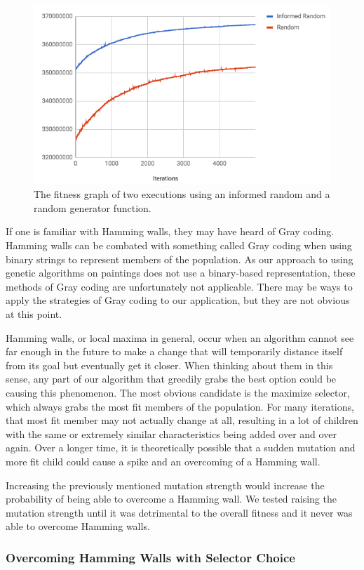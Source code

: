 \begin{figure}
    \centering
    \includegraphics[width=0.6\linewidth]{InformedvsRandom.png}
    \caption[Informed random and random generator fitness graphs]{The fitness graph of two executions using an informed random and a random generator function.}
    \label{fig:informedandrandom}
\end{figure}
If one is familiar with Hamming walls, they may have heard of Gray coding. Hamming walls can be combated with something called Gray coding\cite{hamming} when using binary strings to represent members of the population. As our approach to using genetic algorithms on paintings does not use a binary-based representation, these methods of Gray coding are unfortunately not applicable. There may be ways to apply the strategies of Gray coding to our application, but they are not obvious at this point. 

Hamming walls, or local maxima in general, occur when an algorithm cannot see far enough in the future to make a change that will temporarily distance itself from its goal but eventually get it closer. When thinking about them in this sense, any part of our algorithm that greedily grabs the best option could be causing this phenomenon. The most obvious candidate is the maximize selector, which always grabs the most fit members of the population. For many iterations, that most fit member may not actually change at all, resulting in a lot of children with the same or extremely similar characteristics being added over and over again. Over a longer time, it is theoretically possible that a sudden mutation and more fit child could cause a spike and an overcoming of a Hamming wall.

Increasing the previously mentioned mutation strength would increase the probability of being able to overcome a Hamming wall. We tested raising the mutation strength until it was detrimental to the overall fitness and it never was able to overcome Hamming walls. %

\subsubsection{Overcoming Hamming Walls with Selector Choice}

